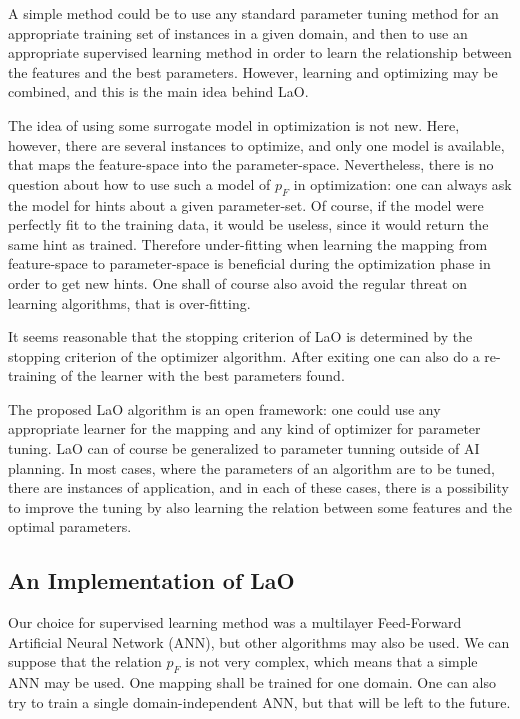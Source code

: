 \documentclass{MYsig-alternate}
\begin{document}
A simple method could be to use any standard parameter tuning method for an appropriate training set of instances in a given domain, and then to use an appropriate supervised learning method in order to learn the relationship between the features and the best parameters. However, learning and optimizing may be combined, and this is the main idea behind LaO.

The idea of using some surrogate model in optimization is not new. Here, however, there are  several instances to optimize, and only one model is available, that maps the feature-space into the parameter-space. Nevertheless, there is no question about how to use such a model of \begin{math}p_F\end{math} in optimization: one can always ask the model for hints about a given parameter-set. Of course, if the model were perfectly fit to the training data, it would be useless, since it would return the same hint as trained. Therefore under-fitting when learning the mapping from feature-space to parameter-space is beneficial during the optimization phase in order to get new hints. One shall of course also avoid the regular threat on learning algorithms, that is over-fitting.

It seems reasonable that the stopping criterion of LaO is determined by the stopping criterion of the optimizer algorithm. After exiting one can also do a re-training of the learner with the best parameters found.

The proposed LaO algorithm is an open framework: one could use any appropriate learner for the mapping and any kind of optimizer for parameter tuning. LaO can of course be generalized to parameter tunning outside of AI planning. In most cases, where the parameters of an algorithm are to be tuned, there are instances of application, and in each of these cases, there is a possibility to improve the tuning by also learning the relation between some features and the optimal parameters.

\subsection{An Implementation of LaO}

Our choice for supervised learning method was a multilayer Feed-Forward Artificial Neural Network (ANN), but other algorithms may also be used. We can suppose that the relation \begin{math}p_F\end{math} is not very complex, which means that a simple ANN may be used. One mapping shall be trained for one domain. One can also try to train a single domain-independent ANN, but that will be left to the future.
\end{document}
